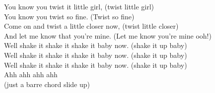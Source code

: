 You know you twist it little girl, (twist little girl)\\
You know you twist so fine. (Twist so fine)\\
Come on and twist a little closer now, (twist little closer)\\
And let me know that you’re mine. (Let me know you’re mine ooh!)\\
Well shake it shake it shake it baby now. (shake it up baby)\\
Well shake it shake it shake it baby now. (shake it up baby)\\
Well shake it shake it shake it baby now. (shake it up baby)\\
  Ahh ahh ahh ahh       \\
(just a barre chord slide up)\\
